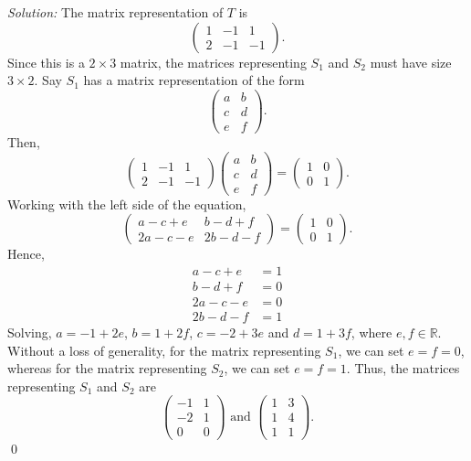 \documentclass{article}
\begin{document}
\newline\textit{Solution:} The matrix representation of $T$ is \[\begin{pmatrix}1&-1&1\\2&-1&-1\end{pmatrix}.\] Since this is a $2 \times 3$ matrix, the matrices representing $S_1$ and $S_2$ must have size $3 \times 2$. Say $S_1$ has a matrix representation of the form \[\begin{pmatrix}a&b\\c&d\\e&f\end{pmatrix}.\] Then, \[\begin{pmatrix}1&-1&1\\2&-1&-1\end{pmatrix}\begin{pmatrix}a&b\\c&d\\e&f\end{pmatrix}=\begin{pmatrix}1&0\\0&1\end{pmatrix}.\] Working with the left side of the equation, \[\begin{pmatrix}a-c+e&b-d+f\\2a-c-e&2b-d-f\end{pmatrix}=\begin{pmatrix}1&0\\0&1\end{pmatrix}.\] Hence, \begin{align*}
    a-c+e&=1\\
    b-d+f&=0\\
    2a-c-e&=0\\
    2b-d-f&=1
\end{align*} Solving, $a=-1+2e$, $b=1+2f$, $c=-2+3e$ and $d=1+3f$, where $e,f\in\mathbb{R}$. Without a loss of generality, for the matrix representing $S_1$, we can set $e=f=0$, whereas for the matrix representing $S_2$, we can set $e=f=1$. Thus, the matrices representing $S_1$ and $S_2$ are \[\begin{pmatrix}-1&1\\-2&1\\0&0\end{pmatrix}\text{ and }\begin{pmatrix}1&3\\1&4\\1&1\end{pmatrix}.\] \qed
\end{document}

